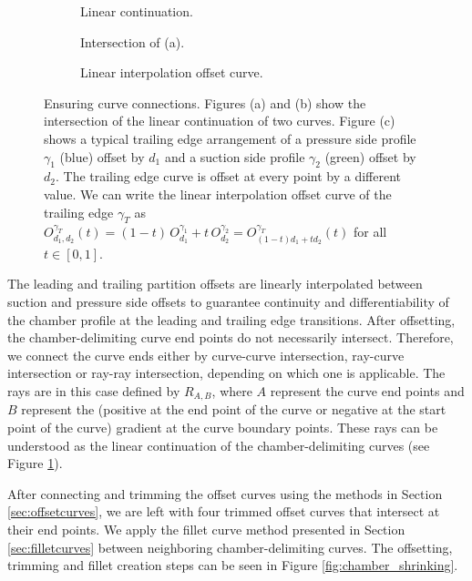 \documentclass[a4paper, 11pt]{report}
\theoremstyle{definition}
\begin{document}
	\begin{figure}[H]
		\centering
		\begin{subfigure}{0.28\textwidth}
			\centering
			
			\caption{Linear continuation.}
		\end{subfigure}
		\begin{subfigure}{0.28\textwidth}
			\centering
			
			\caption{Intersection of (a).}
		\end{subfigure}
		\begin{subfigure}{0.42\textwidth}
			\centering
			
			\caption{Linear interpolation offset curve.}
		\end{subfigure}
		\caption{Ensuring curve connections. Figures (a) and (b) show the intersection of the linear continuation of two curves. Figure (c) shows a typical trailing edge arrangement of a pressure side profile $\gamma_1$ (blue) offset by $d_1$ and a suction side profile $\gamma_2$ (green) offset by $d_2$. The trailing edge curve is offset at every point by a different value. We can write the linear interpolation offset curve of the trailing edge $\gamma_T$ as $O_{d_1, d_2}^{\gamma_T}(t) = (1-t)\,O_{d_1}^{\gamma_1} + t\,O_{d_2}^{\gamma_2} = O^{\gamma_T}_{(1-t)d_1 + td_2}(t)$ for all $t \in [0,1]$.}
		\label{fig:linear_continuation_curve}
	\end{figure}

	The leading and trailing partition offsets are linearly interpolated between suction and pressure side offsets to guarantee continuity and differentiability of the chamber profile at the leading and trailing edge transitions. After offsetting, the chamber-delimiting curve end points do not necessarily intersect. Therefore, we connect the curve ends either by curve-curve intersection, ray-curve intersection or ray-ray intersection, depending on which one is applicable. The rays are in this case defined by $R_{A,B}$, where $A$ represent the curve end points and $B$ represent the (positive at the end point of the curve or negative at the start point of the curve) gradient at the curve boundary points. These rays can be understood as the linear continuation of the chamber-delimiting curves (see Figure \ref{fig:linear_continuation_curve}).

	After connecting and trimming the offset curves using the methods in Section \ref{sec:offsetcurves}, we are left with four trimmed offset curves that intersect at their end points. We apply the fillet curve method presented in Section \ref{sec:filletcurves} between neighboring chamber-delimiting curves. The offsetting, trimming and fillet creation steps can be seen in Figure \ref{fig:chamber_shrinking}.
\end{document}
